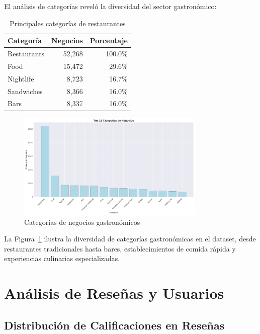 \documentclass[12pt,a4paper,twoside,openany]{book}
\begin{document}
El análisis de categorías reveló la diversidad del sector gastronómico:

\begin{table}[H]
\centering
\caption{Principales categorías de restaurantes}
\begin{tabular}{@{}lrr@{}}
\toprule
\textbf{Categoría} & \textbf{Negocios} & \textbf{Porcentaje} \\
\midrule
Restaurants & 52,268 & 100.0\% \\
Food & 15,472 & 29.6\% \\
Nightlife & 8,723 & 16.7\% \\
Sandwiches & 8,366 & 16.0\% \\
Bars & 8,337 & 16.0\% \\
\bottomrule
\end{tabular}
\end{table}

\begin{figure}[H]
\centering
\includegraphics[width=0.8\textwidth]{figures/business_top_categories.png}
\caption{Categorías de negocios gastronómicos}
\label{fig:business_top_categories}
\end{figure}

La Figura~\ref{fig:business_top_categories} ilustra la diversidad de categorías gastronómicas en el dataset, desde restaurantes tradicionales hasta bares, establecimientos de comida rápida y experiencias culinarias especializadas.

\section{Análisis de Reseñas y Usuarios}

\subsection{Distribución de Calificaciones en Reseñas}
\end{document}

